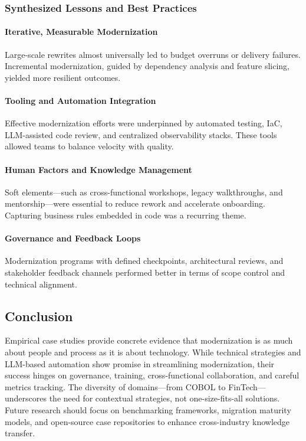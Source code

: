 \documentclass[12pt]{article}
\begin{document}
\vspace{0.5cm}
\subsubsection{Synthesized Lessons and Best Practices}

\paragraph{Iterative, Measurable Modernization}

Large-scale rewrites almost universally led to budget overruns or delivery failures. Incremental modernization, guided by dependency analysis and feature slicing, yielded more resilient outcomes.

\paragraph{Tooling and Automation Integration}

Effective modernization efforts were underpinned by automated testing, IaC, LLM-assisted code review, and centralized observability stacks. These tools allowed teams to balance velocity with quality.

\paragraph{Human Factors and Knowledge Management}

Soft elements—such as cross-functional workshops, legacy walkthroughs, and mentorship—were essential to reduce rework and accelerate onboarding. Capturing business rules embedded in code was a recurring theme.

\paragraph{Governance and Feedback Loops}

Modernization programs with defined checkpoints, architectural reviews, and stakeholder feedback channels performed better in terms of scope control and technical alignment.

\subsection{Conclusion}

Empirical case studies provide concrete evidence that modernization is as much about people and process as it is about technology. While technical strategies and LLM-based automation show promise in streamlining modernization, their success hinges on governance, training, cross-functional collaboration, and careful metrics tracking. The diversity of domains—from COBOL to FinTech—underscores the need for contextual strategies, not one-size-fits-all solutions. Future research should focus on benchmarking frameworks, migration maturity models, and open-source case repositories to enhance cross-industry knowledge transfer.
\end{document}
